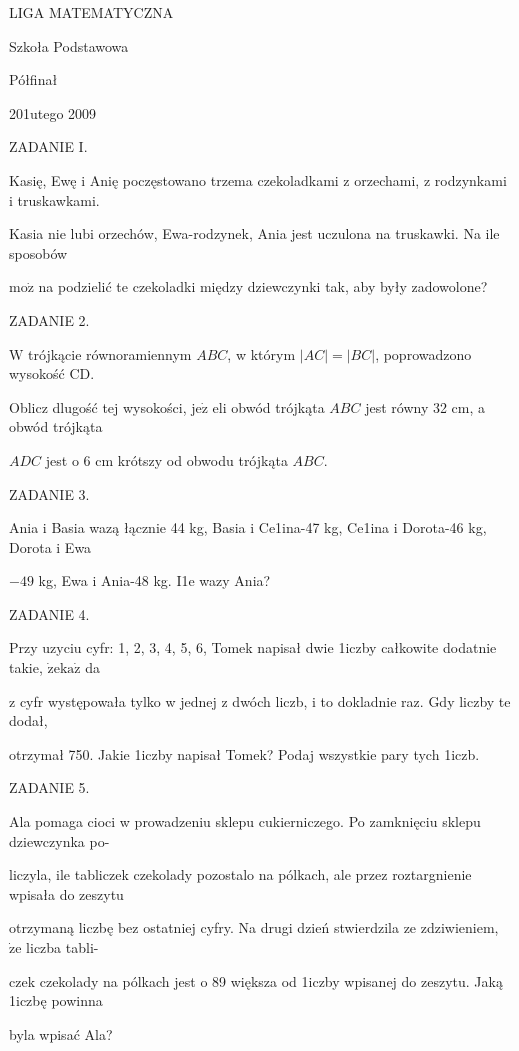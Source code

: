 \documentclass[a4paper,12pt]{article}
\begin{document}
LIGA MATEMATYCZNA

Szkoła Podstawowa

Półfinał

201utego 2009

ZADANIE I.

Kasię, Ewę i Anię poczęstowano trzema czekoladkami z orzechami, z rodzynkami i truskawkami.

Kasia nie lubi orzechów, Ewa-rodzynek, Ania jest uczulona na truskawki. Na ile sposobów

$\mathrm{m}\mathrm{o}\dot{\mathrm{z}}$ na podzielić te czekoladki między dziewczynki tak, aby były zadowolone?

ZADANIE 2.

$\mathrm{W}$ trójkącie równoramiennym $ABC$, w którym $|AC| = |BC|$, poprowadzono wysokość CD.

Oblicz dlugość tej wysokości, $\mathrm{j}\mathrm{e}\dot{\mathrm{z}}$ eli obwód trójkąta $ABC$ jest równy 32 cm, a obwód trójkąta

$ADC$ jest o 6 cm krótszy od obwodu trójkąta $ABC.$

ZADANIE 3.

Ania i Basia wazą łącznie 44 kg, Basia i Ce1ina-47 kg, Ce1ina i Dorota-46 kg, Dorota i Ewa

$-49$ kg, Ewa i Ania-48 kg. I1e wazy Ania?

ZADANIE 4.

Przy uzyciu cyfr: 1, 2, 3, 4, 5, 6, Tomek napisał dwie 1iczby całkowite dodatnie takie, $\dot{\mathrm{z}}\mathrm{e}\mathrm{k}\mathrm{a}\dot{\mathrm{z}}$ da

z cyfr występowała tylko w jednej z dwóch liczb, i to dokladnie raz. Gdy liczby te dodał,

otrzymał 750. Jakie 1iczby napisał Tomek? Podaj wszystkie pary tych 1iczb.

ZADANIE 5.

Ala pomaga cioci w prowadzeniu sklepu cukierniczego. Po zamknięciu sklepu dziewczynka po-

liczyla, ile tabliczek czekolady pozostalo na pólkach, ale przez roztargnienie wpisała do zeszytu

otrzymaną liczbę bez ostatniej cyfry. Na drugi dzień stwierdzila ze zdziwieniem, $\dot{\mathrm{z}}\mathrm{e}$ liczba tabli-

czek czekolady na pólkach jest o 89 większa od 1iczby wpisanej do zeszytu. Jaką 1iczbę powinna

byla wpisać Ala?
\end{document}
